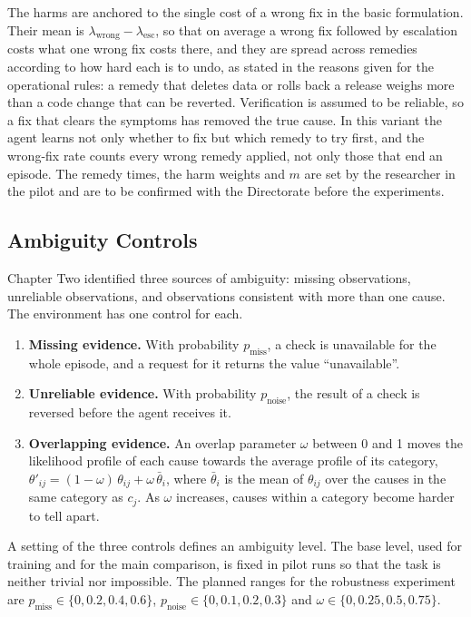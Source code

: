 The harms are anchored to the single cost of a wrong fix in the basic formulation. Their mean is $\lambda_{\text{wrong}} - \lambda_{\text{esc}}$, so that on average a wrong fix followed by escalation costs what one wrong fix costs there, and they are spread across remedies according to how hard each is to undo, as stated in the reasons given for the operational rules: a remedy that deletes data or rolls back a release weighs more than a code change that can be reverted. Verification is assumed to be reliable, so a fix that clears the symptoms has removed the true cause. In this variant the agent learns not only whether to fix but which remedy to try first, and the wrong-fix rate counts every wrong remedy applied, not only those that end an episode. The remedy times, the harm weights and $m$ are set by the researcher in the pilot and are to be confirmed with the Directorate before the experiments.

\subsection{Ambiguity Controls}
\label{sec:ambiguity}

Chapter Two identified three sources of ambiguity: missing observations, unreliable observations, and observations consistent with more than one cause. The environment has one control for each.

\begin{enumerate}
  \item \textbf{Missing evidence.} With probability $p_{\text{miss}}$, a check is unavailable for the whole episode, and a request for it returns the value ``unavailable''.
  \item \textbf{Unreliable evidence.} With probability $p_{\text{noise}}$, the result of a check is reversed before the agent receives it.
  \item \textbf{Overlapping evidence.} An overlap parameter $\omega$ between 0 and 1 moves the likelihood profile of each cause towards the average profile of its category, $\theta'_{ij} = (1 - \omega)\,\theta_{ij} + \omega\,\bar{\theta}_{i}$, where $\bar{\theta}_{i}$ is the mean of $\theta_{ij}$ over the causes in the same category as $c_j$. As $\omega$ increases, causes within a category become harder to tell apart.
\end{enumerate}

A setting of the three controls defines an ambiguity level. The base level, used for training and for the main comparison, is fixed in pilot runs so that the task is neither trivial nor impossible. The planned ranges for the robustness experiment are $p_{\text{miss}} \in \{0, 0.2, 0.4, 0.6\}$, $p_{\text{noise}} \in \{0, 0.1, 0.2, 0.3\}$ and $\omega \in \{0, 0.25, 0.5, 0.75\}$.

